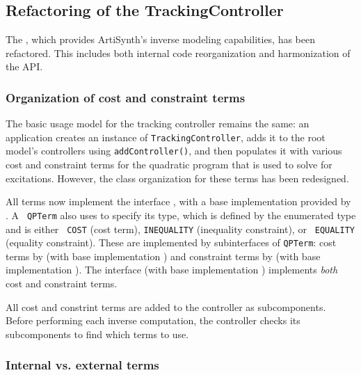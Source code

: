 \documentclass{article}
\begin{document}
\subsection*{Refactoring of the TrackingController}

The , which
provides ArtiSynth's inverse modeling capabilities, has been
refactored. This includes both internal code reorganization and
harmonization of the API.

\subsubsection*{Organization of cost and constraint terms}

The basic usage model for the tracking controller remains the same: an
application creates an instance of 
{\tt TrackingController}, adds it to the root model's controllers
using {\tt addController()}, and then populates it with various cost
and constraint terms for the quadratic program that is used to solve
for excitations.  However, the class organization for these terms has
been redesigned.

All terms now implement the interface
, with a base implementation
provided by .  A {\tt
QPTerm} also uses
 to specify its
type, which is defined by the enumerated type
 and is either {\tt
COST} (cost term), {\tt INEQUALITY} (inequality constraint), or {\tt
EQUALITY} (equality constraint). These are implemented by
subinterfaces of {\tt QPTerm}: cost terms by
 (with base
implementation )
and constraint terms by
 (with base
implementation
).  The
interface  (with
base implementation
) implements
{\it both} cost and constraint terms.

All cost and constrint terms are added to the controller as
subcomponents. Before performing each inverse computation, the
controller checks its subcomponents to find which terms to use.

\subsubsection*{Internal vs. external terms}
\end{document}
